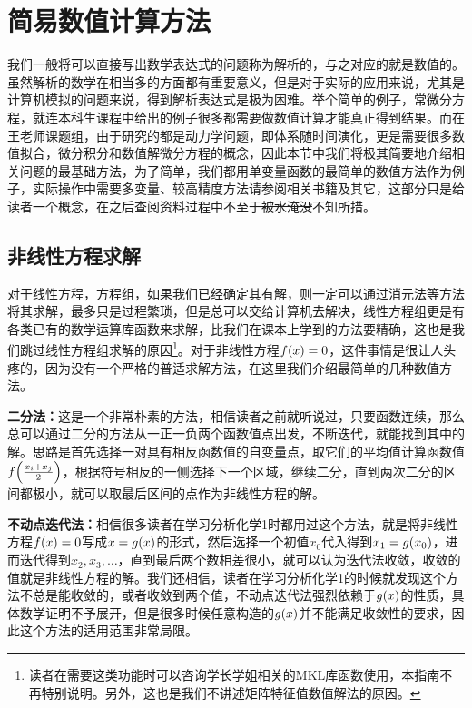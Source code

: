 \documentclass[12pt,a4paper,openany,twoside]{book}
\numberwithin{equation}{section}
\begin{document}
        \section{简易数值计算方法}
          我们一般将可以直接写出数学表达式的问题称为解析的，与之对应的就是数值的。虽然解析的数学在相当多的方面都有重要意义，但是对于实际的应用来说，尤其是计算机模拟的问题来说，得到解析表达式是极为困难。举个简单的例子，常微分方程，就连本科生课程中给出的例子很多都需要做数值计算才能真正得到结果。而在王老师课题组，由于研究的都是动力学问题，即体系随时间演化，更是需要很多数值拟合，微分积分和数值解微分方程的概念，因此本节中我们将极其简要地介绍相关问题的最基础方法，为了简单，我们都用单变量函数的最简单的数值方法作为例子，实际操作中需要多变量、较高精度方法请参阅相关书籍\cite{numerical_calc_methods}及其它，这部分只是给读者一个概念，在之后查阅资料过程中不至于\sout{被水淹没}不知所措。
          \subsection{非线性方程求解}
            对于线性方程，方程组，如果我们已经确定其有解，则一定可以通过消元法等方法将其求解，最多只是过程繁琐，但是总可以交给计算机去解决，线性方程组更是有各类已有的数学运算库函数来求解，比我们在课本上学到的方法要精确，这也是我们跳过线性方程组求解的原因\footnote{读者在需要这类功能时可以咨询学长学姐相关的MKL库函数使用，本指南不再特别说明。另外，这也是我们不讲述矩阵特征值数值解法的原因。}。对于非线性方程$f\qty(x) = 0$，这件事情是很让人头疼的，因为没有一个严格的普适求解方法，在这里我们介绍最简单的几种数值方法。

            \textbf{二分法：}这是一个非常朴素的方法，相信读者之前就听说过，只要函数连续，那么总可以通过二分的方法从一正一负两个函数值点出发，不断迭代，就能找到其中的解。思路是首先选择一对具有相反函数值的自变量点，取它们的平均值计算函数值$f\qty(\frac{x_i + x_j}{2})$，根据符号相反的一侧选择下一个区域，继续二分，直到两次二分的区间都极小，就可以取最后区间的点作为非线性方程的解。

            \textbf{不动点迭代法：}相信很多读者在学习分析化学1时都用过这个方法，就是将非线性方程$f\qty(x)=0$写成$x = g\qty(x)$的形式，然后选择一个初值$x_0$代入得到$x_1 = g\qty(x_0)$，进而迭代得到$x_2,x_3,\dots$，直到最后两个数相差很小，就可以认为迭代法收敛，收敛的值就是非线性方程的解。我们还相信，读者在学习分析化学1的时候就发现这个方法不总是能收敛的，或者收敛到两个值，不动点迭代法强烈依赖于$g\qty(x)$的性质，具体数学证明不予展开，但是很多时候任意构造的$g\qty(x)$并不能满足收敛性的要求，因此这个方法的适用范围非常局限。
\end{document}
